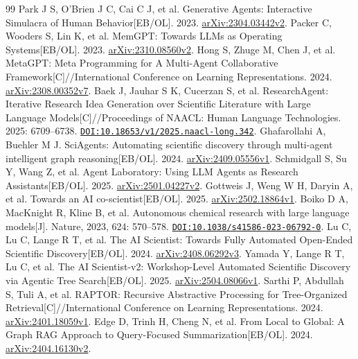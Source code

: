 \begin{thebibliography}{99}
 Park J S, O'Brien J C, Cai C J, et al. Generative Agents: Interactive Simulacra of Human Behavior[EB/OL]. 2023. \href{https://arxiv.org/abs/2304.03442v2}{arXiv:2304.03442v2}.
 Packer C, Wooders S, Lin K, et al. MemGPT: Towards LLMs as Operating Systems[EB/OL]. 2023. \href{https://arxiv.org/abs/2310.08560v2}{arXiv:2310.08560v2}.
 Hong S, Zhuge M, Chen J, et al. MetaGPT: Meta Programming for A Multi-Agent Collaborative Framework[C]//International Conference on Learning Representations. 2024. \href{https://arxiv.org/abs/2308.00352v7}{arXiv:2308.00352v7}.
 Baek J, Jauhar S K, Cucerzan S, et al. ResearchAgent: Iterative Research Idea Generation over Scientific Literature with Large Language Models[C]//Proceedings of NAACL: Human Language Technologies. 2025: 6709--6738. \href{https://doi.org/10.18653/v1/2025.naacl-long.342}{\nolinkurl{DOI:10.18653/v1/2025.naacl-long.342}}.
 Ghafarollahi A, Buehler M J. SciAgents: Automating scientific discovery through multi-agent intelligent graph reasoning[EB/OL]. 2024. \href{https://arxiv.org/abs/2409.05556v1}{arXiv:2409.05556v1}.
 Schmidgall S, Su Y, Wang Z, et al. Agent Laboratory: Using LLM Agents as Research Assistants[EB/OL]. 2025. \href{https://arxiv.org/abs/2501.04227v2}{arXiv:2501.04227v2}.
 Gottweis J, Weng W H, Daryin A, et al. Towards an AI co-scientist[EB/OL]. 2025. \href{https://arxiv.org/abs/2502.18864v1}{arXiv:2502.18864v1}.
 Boiko D A, MacKnight R, Kline B, et al. Autonomous chemical research with large language models[J]. Nature, 2023, 624: 570--578. \href{https://doi.org/10.1038/s41586-023-06792-0}{\nolinkurl{DOI:10.1038/s41586-023-06792-0}}.
 Lu C, Lu C, Lange R T, et al. The AI Scientist: Towards Fully Automated Open-Ended Scientific Discovery[EB/OL]. 2024. \href{https://arxiv.org/abs/2408.06292v3}{arXiv:2408.06292v3}.
 Yamada Y, Lange R T, Lu C, et al. The AI Scientist-v2: Workshop-Level Automated Scientific Discovery via Agentic Tree Search[EB/OL]. 2025. \href{https://arxiv.org/abs/2504.08066v1}{arXiv:2504.08066v1}.
 Sarthi P, Abdullah S, Tuli A, et al. RAPTOR: Recursive Abstractive Processing for Tree-Organized Retrieval[C]//International Conference on Learning Representations. 2024. \href{https://arxiv.org/abs/2401.18059v1}{arXiv:2401.18059v1}.
 Edge D, Trinh H, Cheng N, et al. From Local to Global: A Graph RAG Approach to Query-Focused Summarization[EB/OL]. 2024. \href{https://arxiv.org/abs/2404.16130v2}{arXiv:2404.16130v2}.

\end{thebibliography}
